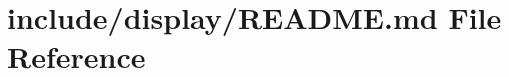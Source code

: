 \hypertarget{include_2display_2README_8md}{}\section{include/display/\+R\+E\+A\+D\+ME.md File Reference}
\label{include_2display_2README_8md}
